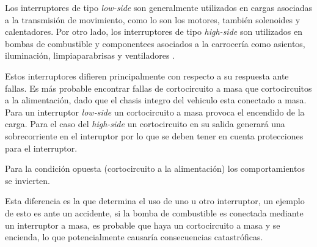 \documentclass[10pt,a4paper]{article}
\begin{document}
Los interruptores de tipo \emph{low-side} son generalmente utilizados en cargas
asociadas a la transmisión de movimiento, como lo son los motores, también
solenoides y calentadores. Por otro lado, los interruptores de tipo
\emph{high-side} son utilizados en bombas de combustible y componentees
asociados a la carrocería como asientos, iluminación, limpiaparabrisas y
ventiladores \cite{DigKey2016}.


Estos interruptores difieren principalmente con respecto a su respuesta ante
fallas. Es más probable encontrar fallas de cortocircuito a masa que
cortocircuitos a la alimentación, dado que el chasis integro del vehiculo esta
conectado a masa. Para un interruptor \emph{low-side} un cortocircuito a masa
provoca el encendido de la carga. Para el caso del \emph{high-side} un
cortocircuito en su salida generará una sobrecorriente en el interuptor por lo
que se deben tener en cuenta protecciones para el interruptor.


Para la condición opuesta (cortocircuito a la alimentación) los comportamientos
se invierten.


Esta diferencia es la que determina el uso de uno u otro interruptor, un ejemplo
de esto es ante un accidente, si la bomba de combustible es conectada mediante
un interruptor a masa, es probable que haya un cortocircuito a masa y se
encienda, lo que potencialmente causaría consecuencias catastróficas.
\end{document}
